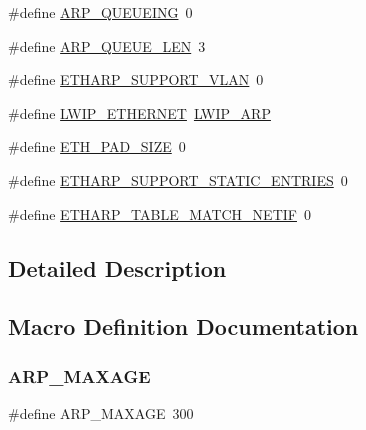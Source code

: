 \begin{DoxyCompactItemize}
\item 
\#define \hyperlink{group__lwip__opts__arp_ga75837814536af29b6102508588d0ab58}{A\+R\+P\+\_\+\+Q\+U\+E\+U\+E\+I\+NG}~0
\item 
\#define \hyperlink{group__lwip__opts__arp_ga29f41a6ebdbb23f46688d381b3609fd1}{A\+R\+P\+\_\+\+Q\+U\+E\+U\+E\+\_\+\+L\+EN}~3
\item 
\#define \hyperlink{group__lwip__opts__arp_ga70ce0ecf56cf5fab000134e66d863f90}{E\+T\+H\+A\+R\+P\+\_\+\+S\+U\+P\+P\+O\+R\+T\+\_\+\+V\+L\+AN}~0
\item 
\#define \hyperlink{group__lwip__opts__arp_ga30e02dc217cc2995d0fd241d510c904f}{L\+W\+I\+P\+\_\+\+E\+T\+H\+E\+R\+N\+ET}~\hyperlink{group__lwip__opts__arp_ga9609a014bba4638cc191d6a8f9556c87}{L\+W\+I\+P\+\_\+\+A\+RP}
\item 
\#define \hyperlink{group__lwip__opts__arp_gad7fa3b356ca7e603e848b069c4cc6276}{E\+T\+H\+\_\+\+P\+A\+D\+\_\+\+S\+I\+ZE}~0
\item 
\#define \hyperlink{group__lwip__opts__arp_ga4675829464156f3d665f4de171c212d7}{E\+T\+H\+A\+R\+P\+\_\+\+S\+U\+P\+P\+O\+R\+T\+\_\+\+S\+T\+A\+T\+I\+C\+\_\+\+E\+N\+T\+R\+I\+ES}~0
\item 
\#define \hyperlink{group__lwip__opts__arp_ga2f762eee309a545650f80fc8dcc19084}{E\+T\+H\+A\+R\+P\+\_\+\+T\+A\+B\+L\+E\+\_\+\+M\+A\+T\+C\+H\+\_\+\+N\+E\+T\+IF}~0
\end{DoxyCompactItemize}


\subsection{Detailed Description}


\subsection{Macro Definition Documentation}
\mbox{\label{group__lwip__opts__arp_ga741a0710dc126ed3ae9e305472df3432}} 
\subsubsection{\texorpdfstring{A\+R\+P\+\_\+\+M\+A\+X\+A\+GE}{ARP\_MAXAGE}\hspace{0.1cm}{\footnotesize\ttfamily [1/2]}}
{\footnotesize\ttfamily \#define A\+R\+P\+\_\+\+M\+A\+X\+A\+GE~300}

